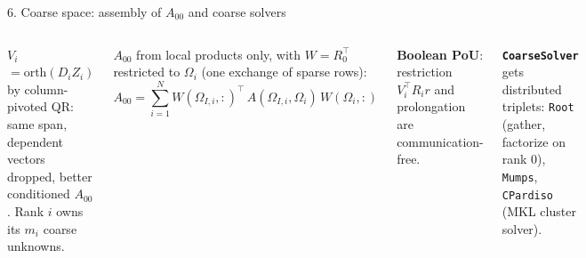 \documentclass[aspectratio=169,10pt]{beamer}
\newcommand{\code}[1]{\texttt{#1}}
\newcommand\Wcoarse{{-2}{-58}{30}{-5.5}}
\newcommand\mapsec[2]{\expandafter\cmsection#1{#2}}
\newcommand\mapbadge[1]{%
  \begin{tikzpicture}[remember picture,overlay]
    \node[anchor=north east,fill=white,rounded corners=1.2pt,inner sep=0.9pt]
      at ($(current page.north east)+(-1.8mm,-0.75mm)$) {\expandafter\cmthumb#1{17mm}};
  \end{tikzpicture}}
\begin{document}
\begin{frame}{6. Coarse space: assembly of $A_{00}$ and coarse solvers}
  \begin{columns}[c,onlytextwidth]
    \small
      \textbf{\color{schwarz}$V_i$} $=\mathrm{orth}(D_iZ_i)$ by column-pivoted QR: same span, dependent vectors dropped, better
            conditioned $A_{00}$. Rank $i$ owns its $m_i$ coarse unknowns.
      
      \vspace{2mm}
      \textbf{\color{schwarz}$A_{00}$} from \alert{local products} only, with $W=R_0^\top$ restricted to $\Omega_i$ (one exchange of sparse rows):
            \[
              A_{00}=\sum_{i=1}^N W(\Omega_{I,i},:)^\top\,A(\Omega_{I,i},\Omega_i)\,W(\Omega_i,:)
            \]
            \vspace{-4mm}

      \vspace{2mm}
      \textbf{\color{schwarz}Boolean PoU}: restriction $V_i^\top R_ir$ and prolongation are communication-free.
      
      \vspace{2mm}
      \textbf{\color{schwarz}\code{CoarseSolver}} gets distributed triplets: \code{Root} (gather, factorize on rank 0), \code{Mumps},
            \code{CPardiso} (MKL cluster solver).
   
    \centering
    \mapsec\Wcoarse{0.98\linewidth}
  \end{columns}
\end{frame}
\end{document}
